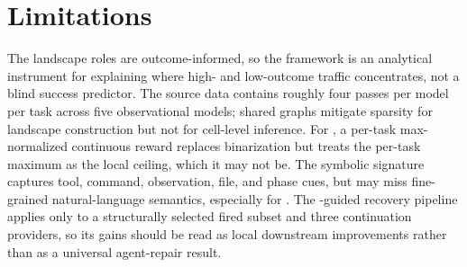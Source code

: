 \section{Limitations}
\label{sec:limitations}

The \method{} landscape roles are outcome-informed, so the framework is an analytical instrument for explaining where high- and low-outcome traffic concentrates, not a blind success predictor.
The source data contains roughly four passes per model per task across five observational models; shared graphs mitigate sparsity for landscape construction but not for cell-level inference.
For \mcp{}, a per-task max-normalized continuous reward replaces binarization but treats the per-task maximum as the local ceiling, which it may not be.
The symbolic signature captures tool, command, observation, file, and phase cues, but may miss fine-grained natural-language semantics, especially for \searchb{}.
The \method{}-guided recovery pipeline applies only to a structurally selected \swe{} fired subset and three continuation providers, so its gains should be read as local downstream improvements rather than as a universal agent-repair result.


